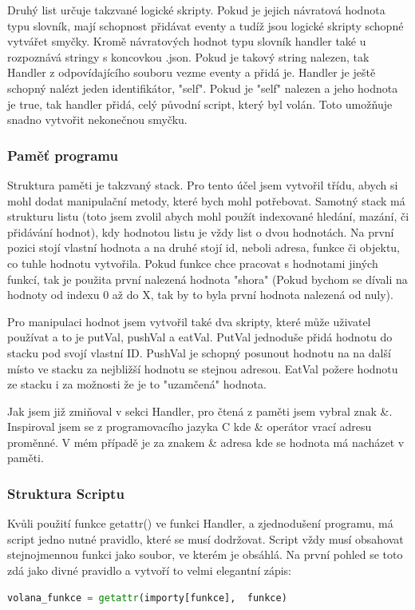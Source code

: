 \documentclass[12pt,a4paper]{article}
\begin{document}
Druhý list určuje takzvané logické skripty. Pokud je jejich návratová hodnota typu slovník, mají schopnost přidávat eventy a tudíž jsou logické skripty schopné vytvářet smyčky. Kromě návratových hodnot typu slovník handler také u rozpoznává stringy s koncovkou .json. Pokud je takový string nalezen, tak Handler z odpovídajícího souboru vezme eventy a přidá je. Handler je ještě schopný nalézt jeden identifikátor, "self". Pokud je "self" nalezen a jeho hodnota je true, tak handler přidá, celý původní script, který byl volán. Toto umožňuje snadno vytvořit nekonečnou smyčku.
\subsubsection{Paměť programu}
Struktura paměti je takzvaný stack. Pro tento účel jsem vytvořil třídu, abych si mohl dodat manipulační metody, které bych mohl potřebovat. Samotný stack má strukturu listu (toto jsem zvolil abych mohl použít indexované hledání, mazání, či přidávání hodnot), kdy hodnotou listu je vždy list o dvou hodnotách. Na první pozici stojí vlastní hodnota a na druhé stojí id, neboli adresa, funkce či objektu, co tuhle hodnotu vytvořila. Pokud funkce chce pracovat s hodnotami jiných funkcí, tak je použita první nalezená hodnota "shora" (Pokud bychom se dívali na hodnoty od indexu 0 až do X, tak by to byla první hodnota nalezená od nuly).

Pro manipulaci hodnot jsem vytvořil také dva skripty, které může uživatel používat a to je putVal, pushVal a eatVal. PutVal jednoduše přidá hodnotu do stacku pod svojí vlastní ID. PushVal je schopný posunout hodnotu na na další místo ve stacku za nejbližší hodnotu se stejnou adresou. EatVal požere hodnotu ze stacku i za možnosti že je to "uzamčená" hodnota.

Jak jsem již zmiňoval v sekci Handler, pro čtená z paměti jsem vybral znak \&. Inspiroval jsem se z programovacího jazyka C kde \& operátor vrací adresu proměnné. V mém případě je za znakem \& adresa kde se hodnota má nacházet v paměti.
\subsubsection{Struktura Scriptu}
Kvůli použití funkce getattr() ve funkci Handler, a zjednodušení programu, má script jedno nutné
pravidlo, které se musí dodržovat. Script vždy musí obsahovat stejnojmennou funkci jako soubor, ve kterém je obsáhlá. Na první pohled se toto zdá jako divné pravidlo a vytvoří to velmi elegantní zápis: 
\begin{lstlisting}[language=Python] 
volana_funkce = getattr(importy[funkce],  funkce) 
\end{lstlisting}
\end{document}
